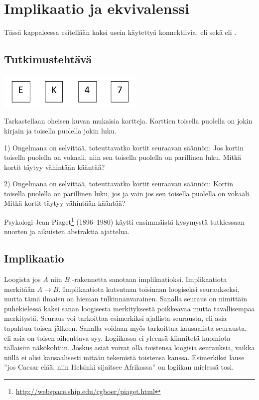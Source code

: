 \newpage


\section{Implikaatio ja ekvivalenssi}
Tässä kappaleessa esitellään kaksi usein käytettyä konnektiivia:  eli  sekä  eli .

\subsection*{Tutkimustehtävä}

\begin{center}
\includegraphics[width=7cm]{pictures/piaget}
\end{center}

Tarkastellaan oheisen kuvan mukaisia kortteja. Korttien toisella puolella on jokin kirjain ja toisella puolella jokin luku.

1) Ongelmana on selvittää, toteuttavatko kortit seuraavan säännön: Jos kortin toisella puolella on vokaali, niin sen toisella puolella on parillinen luku. Mitkä kortit täytyy vähintään kääntää?

2) Ongelmana on selvittää, toteuttavatko kortit seuraavan säännön: Kortin toisella puolella on parillinen luku, jos ja vain jos sen toisella puolella on vokaali. Mitkä kortit täytyy vähintään kääntää?

Psykologi Jean Piaget\footnote{\url{http://webspace.ship.edu/cgboer/piaget.html}} (1896--1980) käytti ensimmäistä kysymystä tutkiessaan nuorten ja aikuisten abstraktia ajattelua.

\subsection*{Implikaatio}

Loogista jos $A$ niin $B$ -rakennetta sanotaan implikaatioksi. Implikaatiota merkitään $A\to B$. Implikaatiota  kutsutaan toisinaan loogiseksi seu\-rauk\-sek\-si, mutta tämä ilmaisu on hieman tulkinnanvarainen. Sanalla seuraus on nimittäin puhekielessä kaksi sanan loogisesta merkityksestä poikkeavaa mutta tavallisempaa merkitystä. Seuraus voi tarkoittaa esimerkiksi ajallista seurausta, eli asia tapahtuu toisen jälkeen. Sanalla voidaan myös tarkoittaa kausaalista seurausta, eli asia on toisen aiheuttava syy. Logiikassa ei yleensä kiinnitetä huomiota tällaisiin näkökohtiin. Joskus asiat voivat olla toistensa loogisia seurauksia, vaikka niillä ei olisi kausaalisesti mitään tekemistä toistensa kanssa. Esimerkiksi lause ''jos Caesar elää, niin Helsinki sijaitsee Afrikassa'' on logiikan mielessä tosi. 

